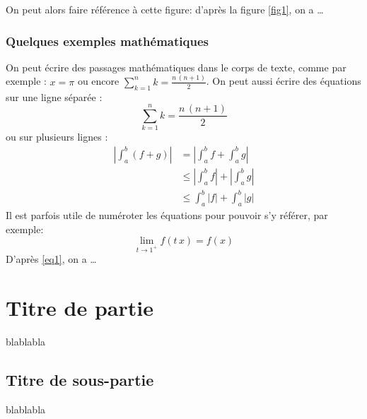 \documentclass[a4paper,12pt]{article}
\begin{document}
On peut alors faire référence à cette figure: d'après la figure \ref{fig1}, on a \dots

\subsubsection{Quelques exemples mathématiques}

On peut écrire des passages mathématiques dans le corps de texte, comme par exemple : $x=\pi$ ou encore $\sum_{k=1}^n k=\frac{n\, (n+1)}{2}$. On peut aussi écrire des équations sur une ligne séparée :
\[ \sum_{k=1}^n k=\frac{n\, (n+1)}{2}\]
ou sur plusieurs lignes :
\begin{align*}
\left| \int_a^b (f + g) \right| &=  \left| \int_a^b f +  \int_a^b g \right| \\
& \leq \left| \int_a^b f  \right| +  \left| \int_a^b g \right| \\
& \leq \int_a^b |f| +  \int_a^b |g|
\end{align*}
Il est parfois utile de numéroter les équations pour pouvoir s'y référer, par exemple:
\begin{equation}\label{eq1}
\lim_{t\to 1^+} f(t\, x)= f(x)
\end{equation}
D'après \eqref{eq1}, on a \dots 




\section{Titre de partie}

blablabla

\subsection{Titre de sous-partie}

blablabla
\end{document}

